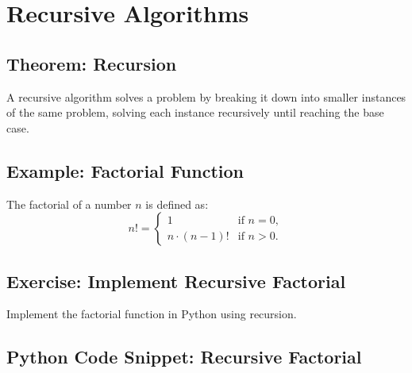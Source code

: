 \begin{example}
    \centering
\end{example}


\section{Recursive Algorithms}

\subsection{Theorem: Recursion}
\begin{theorem}
A recursive algorithm solves a problem by breaking it down into smaller instances of the same problem, solving each instance recursively until reaching the base case.
\end{theorem}

\subsection{Example: Factorial Function}
\begin{example}
The factorial of a number $n$ is defined as:
\[
n! = \begin{cases}
1 & \text{if } n = 0, \\
n \cdot (n - 1)! & \text{if } n > 0.
\end{cases}
\]
\end{example}

\subsection{Exercise: Implement Recursive Factorial}
\begin{exercise}
Implement the factorial function in Python using recursion.
\end{exercise}

\subsection{Python Code Snippet: Recursive Factorial}
\begin{codesnippet}
\end{codesnippet}

